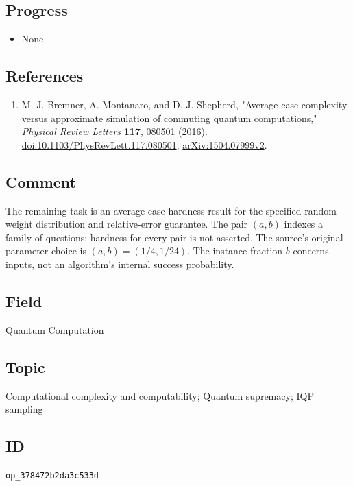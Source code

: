 \subsection*{Progress}

\begin{itemize}
  \item None
\end{itemize}

\subsection*{References}

\begin{enumerate}[label={},leftmargin=4.8em,labelsep=0.5em]
  \footnotesize
  \item[\textup{[BMS16]}]\label{ref:bms-ising-source}
  M. J. Bremner, A. Montanaro, and D. J. Shepherd,
"Average-case complexity versus approximate simulation of commuting quantum computations,"
\emph{Physical Review Letters} \textbf{117}, 080501 (2016).
\href{https://doi.org/10.1103/PhysRevLett.117.080501}{doi:10.1103/PhysRevLett.117.080501};
\href{https://arxiv.org/abs/1504.07999v2}{arXiv:1504.07999v2}.
\end{enumerate}

\subsection*{Comment}

The remaining task is an average-case hardness result for the specified
random-weight distribution and relative-error guarantee. The pair $(a,b)$
indexes a family of questions; hardness for every pair is not asserted.
The source's original parameter choice is $(a,b)=(1/4,1/24)$.
The instance fraction $b$ concerns inputs, not an algorithm's internal
success probability.

\subsection*{Field}

Quantum Computation

\subsection*{Topic}

Computational complexity and computability; Quantum supremacy; IQP sampling

\subsection*{ID}

\texttt{op\_378472b2da3c533d}
